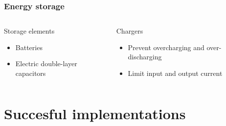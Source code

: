 \documentclass{beamer}
\begin{document}
\begin{frame}
  \frametitle{Energy storage}

\begin{columns}
\begin{column}{.45\textwidth}

\begin{block}{Storage elements}
\begin{itemize}
 \item Batteries
 \item Electric double-layer capacitors
\end{itemize}
\end{block}



\end{column}

\begin{column}{.5\textwidth}

\begin{block}{Chargers}
 \begin{itemize}
  \item Prevent overcharging and over-discharging
  \item Limit input and output current
 \end{itemize}
\end{block}
\end{column}

\end{columns}
\begin{center}
\def\svgwidth{.7\textwidth}
{\footnotesize  }
\end{center}


\end{frame}

\section{Succesful implementations}
\end{document}
